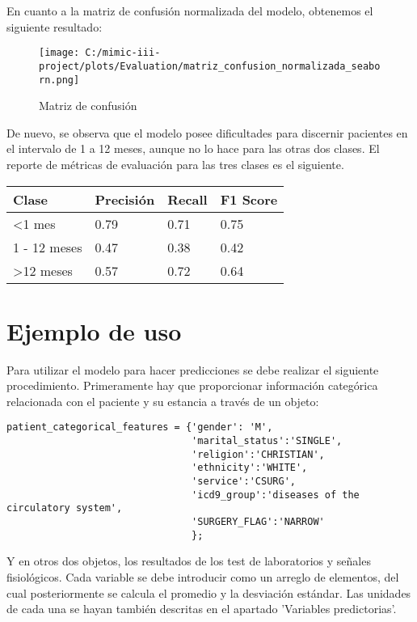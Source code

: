\documentclass{report}
\begin{document}
En cuanto a la matriz de confusión normalizada del modelo, obtenemos el
siguiente resultado:

\begin{figure}[H]
\centering
\texttt{[image: C:/mimic-iii-project/plots/Evaluation/matriz\_confusion\_normalizada\_seaborn.png]}
\caption{Matriz de confusión}
\end{figure}

De nuevo, se observa que el modelo posee dificultades para discernir
pacientes en el intervalo de 1 a 12 meses, aunque no lo hace para las
otras dos clases.
El reporte de métricas de evaluación para las tres clases es el
siguiente.

\begin{longtable}[]{@{}llll@{}}
\toprule
Clase & Precisión & Recall & F1 Score\tabularnewline
\midrule
\endhead
\textless{}1 mes & 0.79 & 0.71 & 0.75\tabularnewline
1 - 12 meses & 0.47 & 0.38 & 0.42\tabularnewline
\textgreater{}12 meses & 0.57 & 0.72 & 0.64\tabularnewline
\bottomrule
\end{longtable}

\section{Ejemplo de uso}
Para utilizar el modelo para hacer predicciones se debe realizar el
siguiente procedimiento.
Primeramente hay que proporcionar información categórica relacionada con
el paciente y su estancia a través de un objeto:

\begin{verbatim}
patient_categorical_features = {'gender': 'M',
                                'marital_status':'SINGLE',
                                'religion':'CHRISTIAN',
                                'ethnicity':'WHITE',
                                'service':'CSURG',
                                'icd9_group':'diseases of the circulatory system',
                                'SURGERY_FLAG':'NARROW'
                                };
\end{verbatim}

Y en otros dos objetos, los resultados de los test de laboratorios y señales fisiológicos. Cada variable se debe introducir como un arreglo de elementos, del cual posteriormente se calcula el promedio y la desviación estándar. Las unidades de cada una se hayan también descritas en el apartado 'Variables predictorias'.
\end{document}
